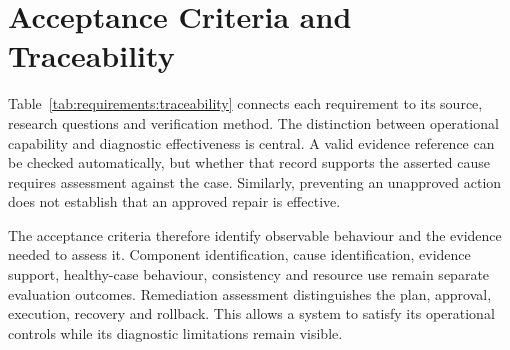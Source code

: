 \section{Acceptance Criteria and Traceability}
\label{sec:requirements:acceptance}

Table~\ref{tab:requirements:traceability} connects each requirement to its
source, research questions and verification method. The distinction
between operational capability and diagnostic effectiveness is central.
A valid evidence reference can be checked automatically, but whether that
record supports the asserted cause requires assessment against the case.
Similarly, preventing an unapproved action does not establish that an
approved repair is effective.

The acceptance criteria therefore identify observable behaviour and the
evidence needed to assess it. Component identification, cause identification,
evidence support, healthy-case behaviour, consistency and resource use
remain separate evaluation outcomes. Remediation assessment distinguishes
the plan, approval, execution, recovery and rollback. This allows a system
to satisfy its operational controls while its diagnostic limitations remain
visible.

